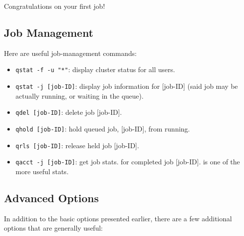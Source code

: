 \documentclass{easychair}
\begin{document}
Congratulations on your first job! 

\subsection{Job Management}

Here are useful job-management commands: 

\begin{itemize}
\item
\texttt{qstat -f -u "*"}: display cluster status for all users. 

\item
\texttt{qstat -j [job-ID]}: display job information for [job-ID] (said job may be actually running, or waiting in the queue). 

\item
\texttt{qdel [job-ID]}: delete job [job-ID]. 

\item
\texttt{qhold [job-ID]}: hold queued job, [job-ID], from running. 

\item
\texttt{qrls [job-ID]}: release held job [job-ID]. 

\item
\texttt{qacct -j [job-ID]}: get job stats. for completed job [job-ID].  is one of the more useful stats. 
\end{itemize}


\subsection{Advanced  Options}

In addition to the basic  options presented earlier, there are a few additional options that are generally useful:
\end{document}
